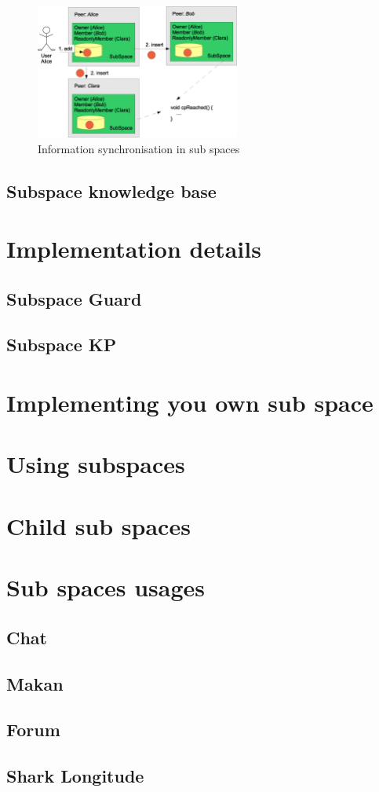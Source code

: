 \begin{figure}[t]
\centering
\includegraphics[width=0.60\textwidth]{subspaceAddingCP.eps}
\caption{Information synchronisation in sub spaces}
\label{fig:subspaceAddingCP}
\end{figure}

\subsection{Subspace knowledge base}

\section{Implementation details}
\subsection{Subspace Guard}
\subsection{Subspace KP}
\section{Implementing you own sub space}
\section{Using subspaces}

\section{Child sub spaces}

\section{Sub spaces usages}
\subsection{Chat}
\subsection{Makan}
\subsection{Forum}
\subsection{Shark Longitude}
